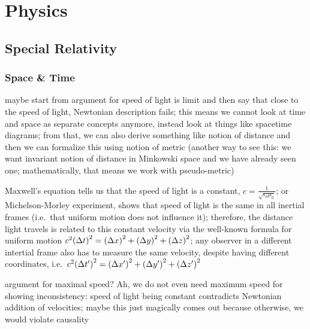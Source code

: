




\chapter{Physics}

	\section{Special Relativity}
		\subsection{Space \& Time}
maybe start from argument for speed of light is limit and then say that close to the speed of light, Newtonian description fails; this means we cannot look at time and space as separate concepts anymore, instead look at things like spacetime diagrams; from that, we can also derive something like notion of distance and then we can formalize this using notion of metric (another way to see this: we want invariant notion of distance in Minkowski space and we have already seen one; mathematically, that means we work with pseudo-metric)



Maxwell's equation tells us that the speed of light is a constant, $c = \frac{1}{\sqrt{\epsilon_0 \mu_0}}$; or Michelson-Morley experiment, shows that speed of light is the same in all inertial frames (i.e.~that uniform motion does not influence it); therefore, the distance light travels is related to this constant velocity via the well-known formula for uniform motion $c^2 \qty(\Delta t)^2 = \qty(\Delta x)^2 + \qty(\Delta y)^2 + \qty(\Delta z)^2$; any observer in a different intertial frame also has to measure the same velocity, despite having different coordinates, i.e.~$c^2 \qty(\Delta t')^2 = \qty(\Delta x')^2 + \qty(\Delta y')^2 + \qty(\Delta z')^2$

argument for maximal speed? Ah, we do not even need maximum speed for showing inconsistency: speed of light being constant contradicts Newtonian addition of velocities; maybe this just magically comes out because otherwise, we would violate causality



